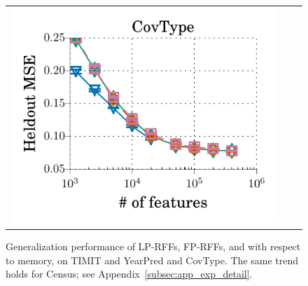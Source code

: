\begin{figure}
\begin{small}
\begin{tabular}{@{\hskip -0.05in}c@{\hskip -0.1in}c@{\hskip -0.1in}c@{\hskip -0.05in}}
		\includegraphics[width=0.34\linewidth]{figures/covtype_error_vs_n_feat.pdf}	
	\end{tabular}
	\end{small}
	\caption{Generalization performance of LP-RFFs, FP-RFFs, and \Nystrom with respect to memory, on TIMIT and YearPred and CovType. The same trend holds for Census; see Appendix~\ref{subsec:app_exp_detail}.
}
	\label{fig:generalization_col}
\end{figure}

